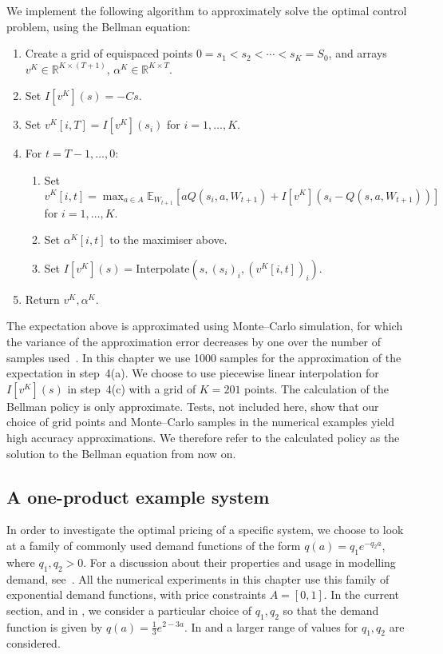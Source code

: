 \documentclass[main.tex]{subfiles}
\begin{document}
We implement the following algorithm to approximately solve the optimal control
problem, using the Bellman equation:
\begin{enumerate}
\item Create a grid of equispaced points $0=s_1<s_2<\cdots<s_K=S_0$, and arrays $v^K\in\mathbb R^{K\times(T+1)}$,
  $\alpha^K\in\mathbb R^{K\times T}$.
\item Set $I[v^K](s)=-Cs$.
\item Set $v^K[i,T]=I[v^K](s_i)$ for $i=1,\dots, K$.
\item For $t = T-1,\dots,0$:
  \begin{enumerate}
  \item Set $\displaystyle v^K[i,t]=\max_{a\in A}\mathbb E_{W_{t+1}}\left[ aQ(s_i,a,W_{t+1})
      +I[v^K](s_i-Q(s,a,W_{t+1}))\right]$\\ for $i=1,\dots,K$.
  \item Set $\alpha^K[i,t]$ to the maximiser above.
  \item Set $I[v^K](s) = \mathrm{Interpolate}(s, {(s_i)}_i,{(v^K[i,t])}_i)$.
  \end{enumerate}
\item Return $v^K,\alpha^K$.
\end{enumerate}
The expectation above is approximated using Monte--Carlo simulation,
for which the variance of the approximation error decreases by one over the
number of samples used~\citep{caflisch1998monte}.
In this chapter we use \num{1000} samples for the approximation of the
expectation in step~4(a).
We choose to use piecewise
linear interpolation for $I[v^K](s)$ in step~4(c) with a grid of
$K=201$ points.
The calculation of the Bellman policy is only
approximate. Tests, not included here, show that our choice of grid points and Monte--Carlo samples
in the numerical examples yield high accuracy approximations.
We therefore refer to the calculated policy as the solution to the
Bellman equation from now on.


\subsection{A one-product example system}\label{subsec:bellman_example_markdown}
In order to investigate the optimal pricing of a specific system, we
choose to look at a family of commonly used demand functions of the form
$q(a)=q_1e^{-q_2a}$, where $q_1,q_2>0$. For a discussion
about their properties and usage in modelling demand, see~\citet[Ch.~7]{talluri2006theory}.
All the numerical experiments in this chapter use this family of exponential
demand functions, with price constraints $A=[0,1]$.
In the current section, and in
,
we consider a particular choice of $q_1,q_2$ so that the demand
function is given by $q(a)=\frac{1}{3}e^{2-3a}$.
In  and  a larger
range of values for $q_1,q_2$ are considered.
\end{document}
